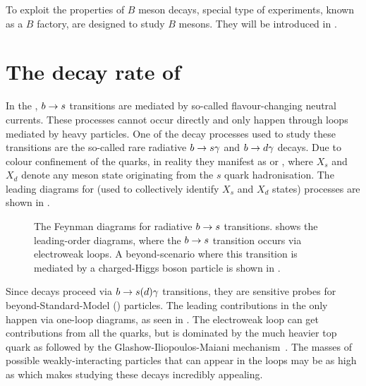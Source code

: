 To exploit the properties of $B$ meson decays, special type of experiments, known as a $B$ factory, are designed to study $B$ mesons.
They will be introduced in .

\section{The decay rate of \texorpdfstring{\BtoXsdgamma}{B->Xsg}}\label{sec:btosgamma_totalrate_theory}

In the \SM, $b\rightarrow s$ transitions are mediated by so-called flavour-changing neutral currents.
These processes cannot occur directly and only happen through loops mediated by heavy particles.
One of the decay processes used to study these transitions are the so-called rare radiative $b\rightarrow s\gamma$ and $b\rightarrow d\gamma$ decays.
Due to colour confinement of the quarks, in reality they manifest as \BtoXsgamma or \BtoXdgamma, where $X_s$ and $X_d$ denote any meson state originating from the $s$ quark hadronisation.
The leading \SM diagrams for \BtoXsdgamma (used to collectively identify $X_s$ and $X_d$ states) processes are shown in .

\begin{figure}[htbp!]
\resizebox{0.66\textwidth}{!}{
    \subcaptionbox{\label{fig:sm_diagrams}}{
        
        
    }
}
\resizebox{0.33\textwidth}{!}{
\subcaptionbox{\label{fig:bsm_diagrams}}{
    
}
}
\caption{\label{fig:b_to_s_gamma_diagrams}
The Feynman diagrams for radiative $b\rightarrow s$ transitions. 
 shows the leading-order \SM diagrams, where the $b\rightarrow s$ transition occurs via electroweak loops.
A beyond-\SM scenario where this transition is mediated by a charged-Higgs boson particle is shown in .
}
\end{figure}

Since \BtoXsdgamma decays proceed via $b\rightarrow s(d)\gamma$ transitions, they are sensitive probes for beyond-Standard-Model (\BSM) particles. 
The leading contributions in the \SM only happen via one-loop diagrams, as seen in .
The electroweak loop can get contributions from all the quarks, but is dominated by the much heavier top quark \cite{Mannel:2001vn} as followed by the Glashow-Iliopoulos-Maiani mechanism~\cite{Glashow:1970gm}. 
The masses of possible \BSM weakly-interacting particles that can appear in the loops may be as high as  \cite{Misiak:2020vlo} which makes studying these decays incredibly appealing.

